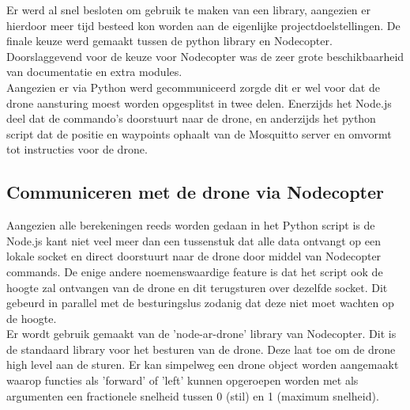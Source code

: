 Er werd al snel besloten om gebruik te maken van een library, aangezien er hierdoor meer tijd besteed kon worden aan de eigenlijke projectdoelstellingen.
De finale keuze werd gemaakt tussen de python library en Nodecopter.
Doorslaggevend voor de keuze voor Nodecopter was de zeer grote beschikbaarheid van documentatie en extra modules.\\
Aangezien er via Python werd gecommuniceerd zorgde dit er wel voor dat de drone aansturing moest worden opgesplitst in twee delen.
Enerzijds het Node.js deel dat de commando's doorstuurt naar de drone, en anderzijds het python script dat de positie en waypoints ophaalt van de Mosquitto server en omvormt tot instructies voor de drone.

\subsection{Communiceren met de drone via Nodecopter}
Aangezien alle berekeningen reeds worden gedaan in het Python script is de Node.js kant niet veel meer dan een tussenstuk dat alle data ontvangt op een lokale socket en direct doorstuurt naar de drone door middel van Nodecopter commands.
De enige andere noemenswaardige feature is dat het script ook de hoogte zal ontvangen van de drone en dit terugsturen over dezelfde socket.
Dit gebeurd in parallel met de besturingslus zodanig dat deze niet moet wachten op de hoogte.\\

Er wordt gebruik gemaakt van de 'node-ar-drone' library van Nodecopter.
Dit is de standaard library voor het besturen van de drone.
Deze laat toe om de drone high level aan de sturen.
Er kan simpelweg een drone object worden aangemaakt waarop functies als 'forward' of 'left' kunnen opgeroepen worden met als argumenten een fractionele snelheid tussen 0 (stil) en 1 (maximum snelheid).\\

